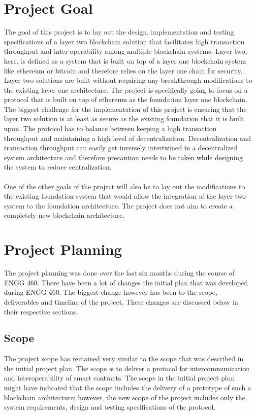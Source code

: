 \documentclass[a4paper,twoside,phd]{BYUPhys}
\begin{document}
\section{Project Goal}
The goal of this project is to lay out the design, implementation and testing specifications of a layer two blockchain solution that facilitates high transaction throughput and inter-operability among multiple blockchain systems. Layer two, here, is defined as a system that is built on top of a layer one blockchain system like ethereum or bitcoin and therefore relies on the layer one chain for security. Layer two solutions are built without requiring any breakthrough modifications to the existing layer one architecture. The project is specifically going to focus on a protocol that is built on top of ethereum as the foundation layer one blockchain. The biggest challenge for the implementation of this project is ensuring that the layer two solution is at least as secure as the existing foundation that it is built upon. The protocol has to balance between keeping a high transaction throughput and maintaining a high level of decentralization. Decentralization and transaction throughput can easily get inversely intertwined in a decentralized system architecture and therefore precaution needs to be taken while designing the system to reduce centralization.
\\
\\ One of the other goals of the project will also be to lay out the modifications to the existing foundation system that would allow the integration of the layer two system to the foundation architecture. The project does not aim to create a completely new blockchain architecture.
\section{Project Planning}
The project planning was done over the last six months during the course of ENGG 460. There have been a lot of changes the initial plan that was developed during ENGG 460. The biggest change however has been to the scope, deliverables and timeline of the project. These changes are discussed below in their respective sections.

\subsection{Scope}
The project scope has remained very similar to the scope that was described in the initial project plan. The scope is to deliver a protocol for intercommunication and interoperability of smart contracts. The scope in the initial project plan might have indicated that the scope includes the delivery of a prototype of such a blockchain architecture; however, the new scope of the project includes only the system requirements, design and testing specifications of the protocol. 
\end{document}
